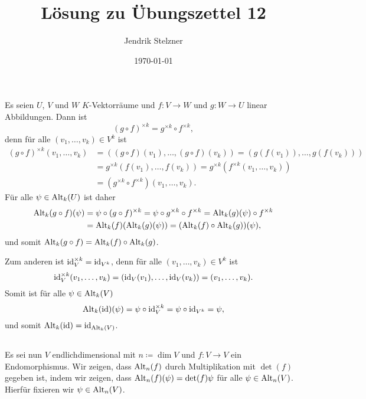 \documentclass[a4paper,10pt]{article}
\title{Lösung zu Übungszettel 12}
\author{Jendrik Stelzner}
\date{\today}
\begin{document}
\maketitle





\section{}



\subsection{}
Es seien $U$, $V$ und $W$ $K$-Vektorräume und $f \colon V \to W$ und $g \colon W \to U$ linear Abbildungen. Dann ist
\[
 (g \circ f)^{\times k} = g^{\times k} \circ f^{\times k},
\]
denn für alle $(v_1, \dotsc, v_k) \in V^k$ ist
\begin{align*}
 (g \circ f)^{\times k}(v_1, \dotsc, v_k)
 &= ((g \circ f)(v_1), \dotsc, (g \circ f)(v_k))
 = (g(f(v_1)), \dotsc, g(f(v_k))) \\
 &= g^{\times k}(f(v_1), \dotsc, f(v_k))
 = g^{\times k}( f^{\times k}(v_1, \dotsc, v_k) ) \\
 &= (g^{\times k} \circ f^{\times k})(v_1, \dotsc, v_k).
\end{align*}
Für alle $\psi \in \mathrm{Alt}_k(U)$ ist daher
\begin{align*}
 \mathrm{Alt}_k(g \circ f)(\psi)
 &= \psi \circ (g \circ f)^{\times k}
 = \psi \circ g^{\times k} \circ f^{\times k}
 = \mathrm{Alt}_k(g)(\psi) \circ f^{\times k} \\
 &= \mathrm{Alt}_k(f)( \mathrm{Alt}_k(g)(\psi) )
 = (\mathrm{Alt}_k(f) \circ \mathrm{Alt}_k(g))(\psi),
\end{align*}
und somit $\mathrm{Alt}_k(g \circ f) = \mathrm{Alt}_k(f) \circ \mathrm{Alt}_k(g)$.

Zum anderen ist $\mathrm{id}_V^{\times k} = \mathrm{id}_{V^k}$, denn für alle $(v_1, \dotsc, v_k) \in V^k$ ist
\[
 \mathrm{id}_V^{\times k}(v_1, \dotsc, v_k)
 = (\mathrm{id}_V(v_1), \dotsc, \mathrm{id}_V(v_k))
 = (v_1, \dotsc, v_k).
\]
Somit ist für alle $\psi \in \mathrm{Alt}_k(V)$
\[
 \mathrm{Alt}_k(\mathrm{id})(\psi)
 = \psi \circ \mathrm{id}_V^{\times k}
 = \psi \circ \mathrm{id}_{V^k}
 = \psi,
\]
und somit $\mathrm{Alt}_k(\mathrm{id}) = \mathrm{id}_{\mathrm{Alt}_k(V)}$.



\subsection{}
Es sei nun $V$ endlichdimensional mit $n \coloneqq \dim V$ und $f \colon V \to V$ ein Endomorphismus. Wir zeigen, dass $\mathrm{Alt}_n(f)$ durch Multiplikation mit $\det(f)$ gegeben ist, indem wir zeigen, dass $\mathrm{Alt}_n(f)(\psi) = \det(f) \psi$ für alle $\psi \in \mathrm{Alt}_n(V)$. Hierfür fixieren wir $\psi \in \mathrm{Alt}_n(V)$.
\end{document}
